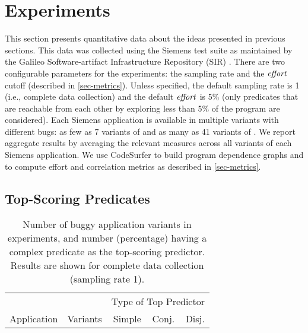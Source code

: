 
\section{Experiments}
\label{sec-experiments}

This section presents quantitative data about the ideas presented in previous sections.  This data was collected using the Siemens test suite \cite{257766} as maintained by the Galileo Software-artifact Infrastructure Repository (SIR) \cite{Do05,SAI}.  There are two configurable parameters for the experiments: the sampling rate and the $\mathit{effort}$ cutoff (described in \autoref{sec-metrics}).  Unless specified, the default sampling rate is 1 (i.e., complete data collection) and the default $\mathit{effort}$ is 5\% (only predicates that are reachable from each other by exploring less than 5\% of the program are considered).  Each Siemens application is available in multiple variants with different bugs: as few as 7 variants of  and as many as 41 variants of .  We report aggregate results by averaging the relevant measures across all variants of each Siemens application.  We use CodeSurfer to build program dependence graphs and to compute effort and correlation metrics as described in \autoref{sec-metrics}.

\subsection{Top-Scoring Predicates}

\begin{table}[tb]
  \centering
  \newlength{\percentwidth}
  \settowidth{\percentwidth}{\%}
  \newcommand{\countcell}[1]{#1\hspace{\percentwidth}}
  \begin{tabular}{lrrrr}
    \toprule
    & & \multicolumn{3}{c}{Type of Top Predictor} \\
    \cmidrule{3-5}
    Application & Variants & Simple & Conj. & Disj. \\
    \midrule
    
    \bottomrule
  \end{tabular}
  \caption{Number of buggy application variants in experiments, and
    number (percentage) having a complex predicate as the top-scoring
    predictor.  Results are shown for complete data collection (sampling
    rate 1).}
  \label{tab-top-pred}
\end{table}

